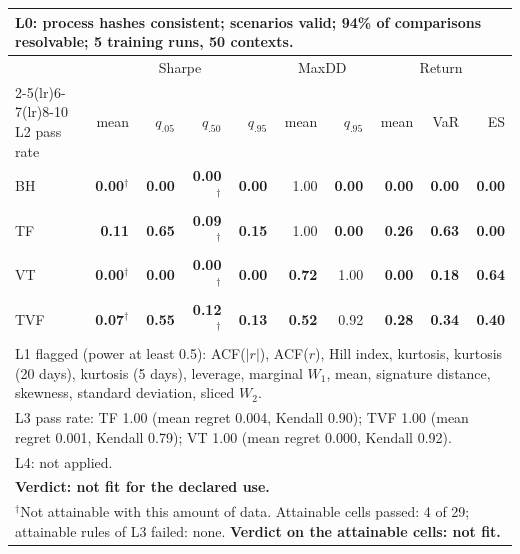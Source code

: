 \begin{tabular}{lrrrrrrrrr}
\toprule
\multicolumn{10}{p{13.5cm}}{L0: process hashes consistent; scenarios valid; 94\% of comparisons resolvable; 5 training runs, 50 contexts.} \\
\midrule
 & \multicolumn{4}{c}{Sharpe} & \multicolumn{2}{c}{MaxDD} & \multicolumn{3}{c}{Return} \\
\cmidrule(lr){2-5}\cmidrule(lr){6-7}\cmidrule(lr){8-10}
L2 pass rate & mean & $q_{.05}$ & $q_{.50}$ & $q_{.95}$ & mean & $q_{.95}$ & mean & VaR & ES \\
\midrule
BH & \textbf{0.00}$^{\dagger}$ & \textbf{0.00} & \textbf{0.00}$^{\dagger}$ & \textbf{0.00} & 1.00 & \textbf{0.00} & \textbf{0.00} & \textbf{0.00} & \textbf{0.00} \\
TF & \textbf{0.11} & \textbf{0.65} & \textbf{0.09}$^{\dagger}$ & \textbf{0.15} & 1.00 & \textbf{0.00} & \textbf{0.26} & \textbf{0.63} & \textbf{0.00} \\
VT & \textbf{0.00}$^{\dagger}$ & \textbf{0.00} & \textbf{0.00}$^{\dagger}$ & \textbf{0.00} & \textbf{0.72} & 1.00 & \textbf{0.00} & \textbf{0.18} & \textbf{0.64} \\
TVF & \textbf{0.07}$^{\dagger}$ & \textbf{0.55} & \textbf{0.12}$^{\dagger}$ & \textbf{0.13} & \textbf{0.52} & 0.92 & \textbf{0.28} & \textbf{0.34} & \textbf{0.40} \\
\midrule
\multicolumn{10}{p{13.5cm}}{L1 flagged (power at least 0.5): ACF($|r|$), ACF($r$), Hill index, kurtosis, kurtosis (20 days), kurtosis (5 days), leverage, marginal $W_1$, mean, signature distance, skewness, standard deviation, sliced $W_2$.} \\
\multicolumn{10}{p{13.5cm}}{L3 pass rate: TF 1.00 (mean regret 0.004, Kendall 0.90); TVF 1.00 (mean regret 0.001, Kendall 0.79); VT 1.00 (mean regret 0.000, Kendall 0.92).} \\
\multicolumn{10}{p{13.5cm}}{L4: not applied.} \\
\multicolumn{10}{p{13.5cm}}{\textbf{Verdict: not fit for the declared use.}} \\
\multicolumn{10}{p{13.5cm}}{$^{\dagger}$Not attainable with this amount of data. Attainable cells passed: 4 of 29; attainable rules of L3 failed: none. \textbf{Verdict on the attainable cells: not fit.}} \\
\bottomrule
\end{tabular}
